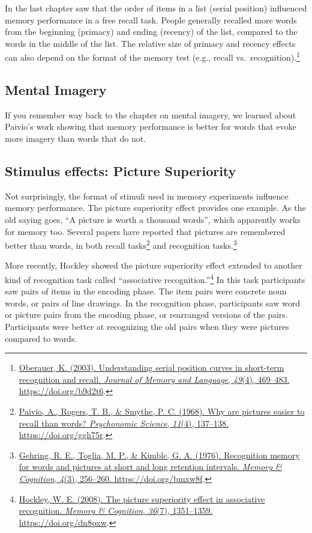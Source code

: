 \documentclass[
  oneside,
  12pt]{crumpbook}
\begin{document}
In the last chapter saw that the order of items in a list (serial position) influenced memory performance in a free recall task. People generally recalled more words from the beginning (primacy) and ending (recency) of the list, compared to the words in the middle of the list. The relative size of primacy and recency effects can also depend on the format of the memory test (e.g., recall vs.~recognition).\footnote{\protect\hyperlink{ref-oberauerUnderstandingSerialPosition2003}{Oberauer, K. (2003). Understanding serial position curves in short-term recognition and recall. \emph{Journal of Memory and Language}, \emph{49}(4), 469--483. \url{https://doi.org/b9d2t6}}.}

\hypertarget{mental-imagery-1}{%
\subsection{Mental Imagery}\label{mental-imagery-1}}

If you remember way back to the chapter on mental imagery, we learned about Paivio's work showing that memory performance is better for words that evoke more imagery than words that do not.

\hypertarget{stimulus-effects-picture-superiority}{%
\subsection{Stimulus effects: Picture Superiority}\label{stimulus-effects-picture-superiority}}

Not surprisingly, the format of stimuli used in memory experiments influence memory performance. The picture superiority effect provides one example. As the old saying goes, ``A picture is worth a thousand words'', which apparently works for memory too. Several papers have reported that pictures are remembered better than words, in both recall tasks\footnote{\protect\hyperlink{ref-paivioWhyArePictures1968}{Paivio, A., Rogers, T. B., \& Smythe, P. C. (1968). Why are pictures easier to recall than words? \emph{Psychonomic Science}, \emph{11}(4), 137--138. \url{https://doi.org/ggh75r}}.} and recognition tasks.\footnote{\protect\hyperlink{ref-gehringRecognitionMemoryWords1976}{Gehring, R. E., Toglia, M. P., \& Kimble, G. A. (1976). Recognition memory for words and pictures at short and long retention intervals. \emph{Memory \& Cognition}, \emph{4}(3), 256--260. \url{https://doi.org/bmxw8f}}.}

More recently, Hockley showed the picture superiority effect extended to another kind of recognition task called ``associative recognition.''\footnote{\protect\hyperlink{ref-hockleyPictureSuperiorityEffect2008}{Hockley, W. E. (2008). The picture superiority effect in associative recognition. \emph{Memory \& Cognition}, \emph{36}(7), 1351--1359. \url{https://doi.org/dn8pxw}}.} In this task participants saw pairs of items in the encoding phase. The item pairs were concrete noun words, or pairs of line drawings. In the recognition phase, participants saw word or picture pairs from the encoding phase, or rearranged versions of the pairs. Participants were better at recognizing the old pairs when they were pictures compared to words.
\end{document}
